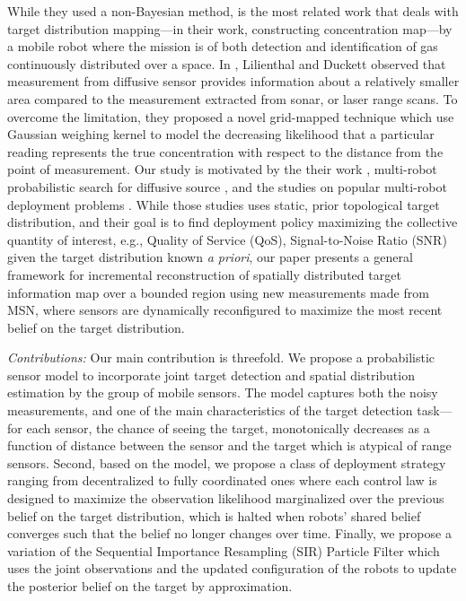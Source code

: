 \documentclass[journal]{IEEEtran}
\begin{document}
While they used a non-Bayesian method, \cite{lilienthal2009statistical} is the most related work that deals with target distribution mapping---in their work, constructing concentration map---by a mobile robot where the mission is of both detection and identification of gas continuously distributed over a space. In \cite{lilienthal2009statistical}, Lilienthal and Duckett observed that measurement from diffusive sensor provides information about a relatively smaller area compared to the measurement extracted from sonar, or laser range scans. To overcome the limitation, they proposed a novel grid-mapped technique which use Gaussian weighing kernel to model the decreasing likelihood that a particular reading represents the true concentration with respect to the distance from the point of measurement.
Our study is motivated by the their work \cite{lilienthal2009statistical}, multi-robot probabilistic search for diffusive source \cite{ristic2010information}, and the studies on popular multi-robot deployment problems \cite{cortes_coverage_2004}. 
While those studies \cite{cortes_coverage_2004} uses static, prior topological target distribution, and their goal is to find deployment policy maximizing the collective quantity of interest, e.g., Quality of Service (QoS), Signal-to-Noise Ratio (SNR)  given the target distribution known \emph{a priori}, our paper presents a general framework for incremental reconstruction of spatially distributed target information map over a bounded region using new measurements made from MSN, where sensors are dynamically reconfigured to maximize the most recent belief on the target distribution.


\textit{Contributions:}
Our main contribution is threefold.
We propose a probabilistic sensor model to incorporate joint target detection and spatial distribution estimation by the group of mobile sensors. The model captures both the noisy measurements, and one of the main characteristics of the target detection task---for each sensor, the chance of seeing the target, monotonically decreases as a function of distance between the sensor and the target which is atypical of range sensors. 
Second, based on the model, we propose a class of deployment strategy ranging from decentralized to fully coordinated ones where each control law is designed to maximize the observation likelihood marginalized over the previous belief on the target distribution, which is halted when robots' shared belief converges such that the belief no longer changes over time. 
Finally, we propose a variation of the Sequential Importance Resampling (SIR) Particle Filter 
which uses the joint observations and the updated configuration of the robots to update the posterior belief on the target by approximation.
\end{document}
